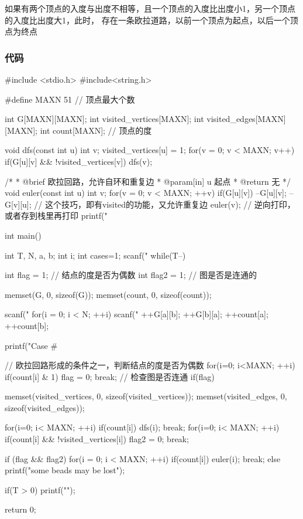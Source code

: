 如果有两个顶点的入度与出度不相等，且一个顶点的入度比出度小1，另一个顶点的入度比出度大1，此时，
存在一条欧拉道路，以前一个顶点为起点，以后一个顶点为终点

\subsubsection{代码}
\begin{Codex}[label=eulerian_circuit.c]
#include <stdio.h>
#include<string.h>

#define MAXN 51  // 顶点最大个数

int G[MAXN][MAXN];
int visited_vertices[MAXN]; 
int visited_edges[MAXN][MAXN];
int count[MAXN]; // 顶点的度

void dfs(const int u) {  
    int v;
    visited_vertices[u] = 1;
    for(v = 0;  v < MAXN; v++) if(G[u][v] && !visited_vertices[v]) {
        dfs(v);
    }
}

/*
 * @brief 欧拉回路，允许自环和重复边
 * @param[in] u 起点
 * @return 无
 */
void euler(const int u){
    int v;
    for(v = 0; v < MAXN; ++v) if(G[u][v]){
        --G[u][v]; --G[v][u]; // 这个技巧，即有visited的功能，又允许重复边
        euler(v);
        // 逆向打印，或者存到栈里再打印
        printf("%
    }
}

int main() {
    int T, N, a, b;
    int i;
    int cases=1;
    scanf("%
    while(T--) {
        int flag = 1; // 结点的度是否为偶数
        int flag2 = 1; // 图是否是连通的
        
        memset(G, 0, sizeof(G));
        memset(count, 0, sizeof(count));

        scanf("%
        for(i = 0; i < N; ++i){
            scanf("%
            ++G[a][b];
            ++G[b][a];
            ++count[a];
            ++count[b];
        }

        printf("Case #%

        // 欧拉回路形成的条件之一，判断结点的度是否为偶数
        for(i=0; i<MAXN; ++i) {
            if(count[i] & 1){
                flag = 0;
                break;
            }
        }
        // 检查图是否连通
        if(flag) {
            memset(visited_vertices, 0, sizeof(visited_vertices));
            memset(visited_edges, 0, sizeof(visited_edges));

            for(i=0; i< MAXN; ++i) 
                if(count[i]) { 
                    dfs(i);
                    break; 
                }
            for(i=0; i< MAXN; ++i){
                if(count[i] && !visited_vertices[i]) {
                    flag2 = 0; 
                    break;
                }
            }
        }
        if (flag && flag2) {
            for(i = 0; i < MAXN; ++i) if(count[i]){
                euler(i);
                break;
            }
        } else {
            printf("some beads may be lost\n");
        }

        if(T > 0) printf("\n");
    }
    return 0;
}
\end{Codex}


